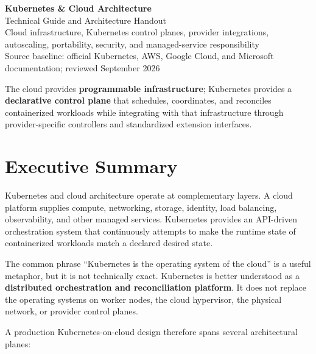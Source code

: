 \documentclass[11pt]{article}
\newcommand{\term}[1]{\textbf{\textcolor{KubeBlue}{#1}}}
\begin{document}
\begin{center}
{\Huge\bfseries\color{Ink} Kubernetes \& Cloud Architecture}\\[4pt]
{\Large\color{KubeBlue} Technical Guide and Architecture Handout}\\[10pt]
{\small\color{Slate} Cloud infrastructure, Kubernetes control planes, provider integrations, autoscaling, portability, security, and managed-service responsibility}\\[6pt]
{\small\color{Slate} Source baseline: official Kubernetes, AWS, Google Cloud, and Microsoft documentation; reviewed September 2026}
\end{center}

\vspace{0.4em}
\begin{keyidea}
The cloud provides \textbf{programmable infrastructure}; Kubernetes provides a \textbf{declarative control plane} that schedules, coordinates, and reconciles containerized workloads while integrating with that infrastructure through provider-specific controllers and standardized extension interfaces.
\end{keyidea}

\tableofcontents
\newpage

\section{Executive Summary}

Kubernetes and cloud architecture operate at complementary layers. A cloud platform supplies compute, networking, storage, identity, load balancing, observability, and other managed services. Kubernetes provides an API-driven orchestration system that continuously attempts to make the runtime state of containerized workloads match a declared desired state.

The common phrase ``Kubernetes is the operating system of the cloud'' is a useful metaphor, but it is not technically exact. Kubernetes is better understood as a \term{distributed orchestration and reconciliation platform}. It does not replace the operating systems on worker nodes, the cloud hypervisor, the physical network, or provider control planes.

A production Kubernetes-on-cloud design therefore spans several architectural planes:
\end{document}
